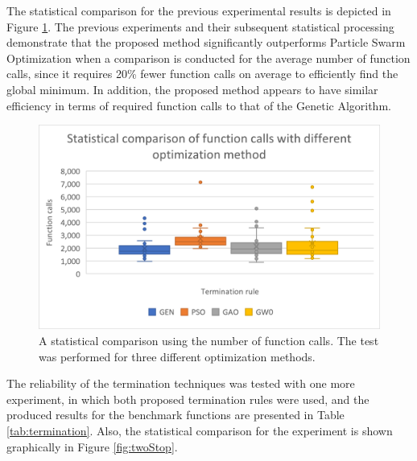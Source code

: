 \documentclass[journal,article,submit,pdftex,moreauthors]{Definitions/mdpi}
\begin{document}
The statistical comparison for the previous experimental results is depicted in Figure \ref{fig:methods}.
The previous experiments and their subsequent statistical processing demonstrate that the proposed method significantly outperforms Particle Swarm Optimization when a comparison is conducted for the average number of function calls, since it requires 20\% fewer function calls on average to efficiently find the global minimum. In addition, the proposed method appears to have similar efficiency in terms of required function calls to that of the Genetic Algorithm.

\begin{figure}[H]

\hspace{-5pt}\includegraphics[scale=0.95]{gao_calls.png}
\caption{A statistical comparison using the number of function  calls. The test was performed for  three different optimization methods. \label{fig:methods}}
\end{figure}

The reliability of the termination techniques was tested with one more experiment, in which both proposed termination rules were used, and the produced results for the benchmark functions are presented in Table \ref{tab:termination}. Also, the statistical comparison for the experiment is shown graphically in Figure \ref{fig:twoStop}.
\end{document}
